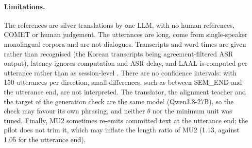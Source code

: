 \paragraph{Limitations.}
The references are silver translations by one LLM, with no human references, COMET or human judgement. The utterances are long, come from single-speaker monolingual corpora and are not dialogues. Transcripts and word times are given rather than recognised (the Korean transcripts being agreement-filtered ASR output), latency ignores computation and ASR delay, and LAAL is computed per utterance rather than as session-level \laal. There are no confidence intervals: with 150 utterances per direction, small differences, such as between SEM\_END and the utterance end, are not interpreted. The translator, the alignment teacher and the target of the generation check are the same model (Qwen3.8-27B), so the check may favour its own phrasing, and neither $\theta$ nor the minimum unit was tuned. Finally, MU2 sometimes re-emits committed text at the utterance end; the pilot does not trim it, which may inflate the \koen length ratio of MU2 (1.13, against 1.05 for the utterance end).
